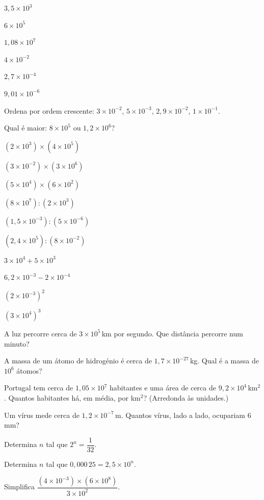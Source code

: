 \documentclass[12pt]{article}
\begin{document}
\begin{exercicios}
  \item $3{,}5 \times 10^3$
  \item $6 \times 10^5$
  \item $1{,}08 \times 10^7$
  \item $4 \times 10^{-2}$
  \item $2{,}7 \times 10^{-4}$
  \item $9{,}01 \times 10^{-6}$
  \item Ordena por ordem crescente: $3 \times 10^{-2}$, $5 \times 10^{-3}$, $2{,}9 \times 10^{-2}$, $1 \times 10^{-1}$.
  \item Qual é maior: $8 \times 10^{5}$ ou $1{,}2 \times 10^{6}$?
\end{exercicios}

\begin{exercicios}
  \item $(2 \times 10^3) \times (4 \times 10^5)$
  \item $(3 \times 10^{-2}) \times (3 \times 10^{6})$
  \item $(5 \times 10^4) \times (6 \times 10^{2})$
  \item $(8 \times 10^7) : (2 \times 10^3)$
  \item $(1{,}5 \times 10^{-3}) : (5 \times 10^{-6})$
  \item $(2{,}4 \times 10^{5}) : (8 \times 10^{-2})$
  \item $3 \times 10^4 + 5 \times 10^3$
  \item $6{,}2 \times 10^{-3} - 2 \times 10^{-4}$
  \item $(2 \times 10^{-3})^2$
  \item $(3 \times 10^{4})^3$
\end{exercicios}

\begin{exercicios}
  \item A luz percorre cerca de $3 \times 10^5$\,km por segundo. Que distância percorre num minuto?
  \item A massa de um átomo de hidrogénio é cerca de $1{,}7 \times 10^{-27}$\,kg. Qual é a massa de $10^{6}$ átomos?
  \item Portugal tem cerca de $1{,}05 \times 10^7$ habitantes e uma área de cerca de $9{,}2 \times 10^4$\,km$^2$. Quantos habitantes há, em média, por km$^2$? (Arredonda às unidades.)
  \item Um vírus mede cerca de $1{,}2 \times 10^{-7}$\,m. Quantos vírus, lado a lado, ocupariam 6\,mm?
  \item Determina $n$ tal que $2^n = \dfrac{1}{32}$.
  \item Determina $n$ tal que $0{,}000\,25 = 2{,}5 \times 10^n$.
  \item Simplifica $\dfrac{(4 \times 10^{-3}) \times (6 \times 10^{8})}{3 \times 10^{2}}$.
\end{exercicios}
\end{document}
